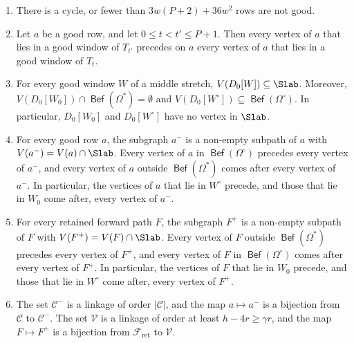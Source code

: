 \documentclass[fontsize=12pt,leading=14pt]{fullpaper}
\DeclareMathOperator{\Bef}{\mathsf{Bef}}
\newcommand{\Ccal}{\mathcal{C}}
\newcommand{\Fcal}{\mathcal{F}}
\newcommand{\Vcal}{\mathcal{V}}
\begin{document}
\begin{lemma}\label{lem:ordered-middle}
  \leavevmode
  \begin{enumerate}[label=\textnormal{(\roman*)}]
    \item\label{item:om-rows} There is a cycle, or fewer than $3w(P+2)+36w^2$ rows are not good.
    \item\label{item:om-order} Let $a$ be a good row, and let $0\le t<t'\le P+1$.
      Then every vertex of $a$ that lies in a good window of $T_{t'}$ precedes on $a$ every vertex of $a$ that lies in a good window of $T_t$.
    \item\label{item:om-slab} For every good window $W$ of a middle stretch, $V(D_0[W])\subseteq\Slab$.
      Moreover, $V(D_0[W_0])\cap\Bef(\Omega^*)=\emptyset$ and $V(D_0[W^\circ])\subseteq\Bef(\Omega^\circ)$.
      In particular, $D_0[W_0]$ and $D_0[W^\circ]$ have no vertex in $\Slab$.
    \item\label{item:om-row} For every good row $a$, the subgraph $a^-$ is a non-empty subpath of $a$ with $V(a^-)=V(a)\cap\Slab$.
      Every vertex of $a$ in $\Bef(\Omega^\circ)$ precedes every vertex of $a^-$, and every vertex of $a$ outside $\Bef(\Omega^*)$ comes after every vertex of $a^-$.
      In particular, the vertices of $a$ that lie in $W^\circ$ precede, and those that lie in $W_0$ come after, every vertex of $a^-$.
    \item\label{item:om-forward} For every retained forward path $F$, the subgraph $F^+$ is a non-empty subpath of $F$ with $V(F^+)=V(F)\cap\Slab$.
      Every vertex of $F$ outside $\Bef(\Omega^*)$ precedes every vertex of $F^+$, and every vertex of $F$ in $\Bef(\Omega^\circ)$ comes after every vertex of $F^+$.
      In particular, the vertices of $F$ that lie in $W_0$ precede, and those that lie in $W^\circ$ come after, every vertex of $F^+$.
    \item\label{item:om-linkages} The set $\Ccal^-$ is a linkage of order $|\Ccal|$, and the map $a\mapsto a^-$ is a bijection from $\Ccal$ to $\Ccal^-$.
      The set $\Vcal$ is a linkage of order at least $h-4r\ge\gamma r$, and the map $F\mapsto F^+$ is a bijection from $\Fcal_{\mathrm{ret}}$ to $\Vcal$.
  \end{enumerate}
\end{lemma}
\end{document}
